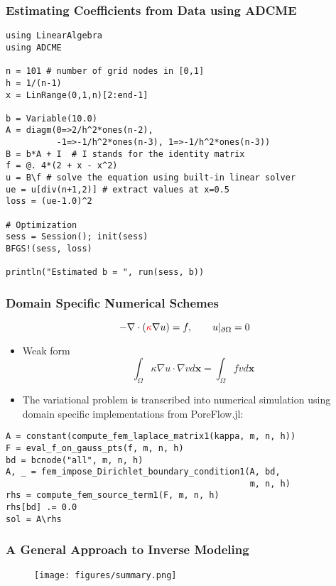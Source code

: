 \documentclass[usenames,dvipsnames]{beamer}
\begin{document}
\begin{frame}[fragile]
	\frametitle{Estimating Coefficients from Data using ADCME}
	\vspace{-0.3cm}
	{\small
	\begin{lstlisting}
using LinearAlgebra
using ADCME

n = 101 # number of grid nodes in [0,1]
h = 1/(n-1)
x = LinRange(0,1,n)[2:end-1]

b = Variable(10.0) 
A = diagm(0=>2/h^2*ones(n-2), 
          -1=>-1/h^2*ones(n-3), 1=>-1/h^2*ones(n-3)) 
B = b*A + I  # I stands for the identity matrix
f = @. 4*(2 + x - x^2) 
u = B\f # solve the equation using built-in linear solver
ue = u[div(n+1,2)] # extract values at x=0.5
loss = (ue-1.0)^2 

# Optimization
sess = Session(); init(sess) 
BFGS!(sess, loss)

println("Estimated b = ", run(sess, b))
	\end{lstlisting}
	}
\end{frame}

\begin{frame}[fragile]
	\frametitle{Domain Specific Numerical Schemes}
	
	\begin{equation*}
		-\nabla \cdot (\textcolor{red}{\kappa} \nabla u) = f, \qquad u|_{\partial \Omega} = 0 
	\end{equation*}
	
	\begin{itemize}
		\item Weak form 
		\begin{equation*}
			\int_\Omega \kappa \nabla u \cdot \nabla v d\mathbf{x} = \int_\Omega f v d\mathbf{x}
		\end{equation*}
		\item The variational problem is transcribed into numerical simulation using domain specific implementations from PoreFlow.jl:
	\end{itemize}
	{\small
	\begin{lstlisting}
A = constant(compute_fem_laplace_matrix1(kappa, m, n, h))
F = eval_f_on_gauss_pts(f, m, n, h)
bd = bcnode("all", m, n, h)
A, _ = fem_impose_Dirichlet_boundary_condition1(A, bd, 
                                                m, n, h)
rhs = compute_fem_source_term1(F, m, n, h)
rhs[bd] .= 0.0
sol = A\rhs\end{lstlisting}
}
\end{frame}



\begin{frame}
	\frametitle{A General Approach to Inverse Modeling}
	\begin{figure}[hbt]
  \texttt{[image: figures/summary.png]}
\end{figure}

\end{frame}
\end{document}
